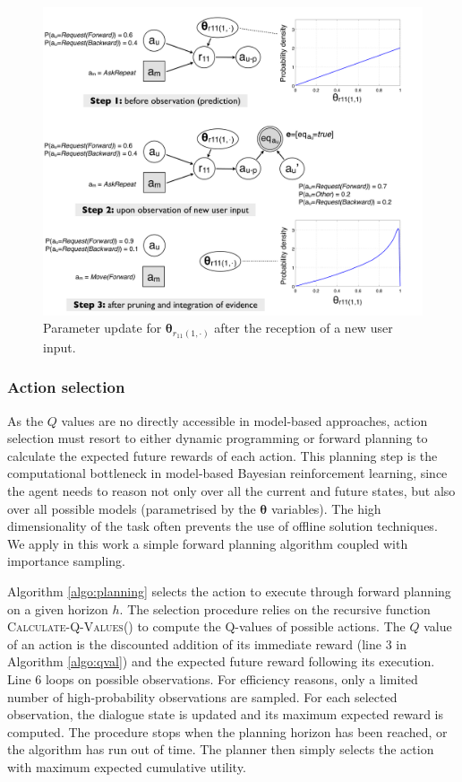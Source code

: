 \begin{figure}[h]
\centering
\includegraphics[scale=0.30]{imgs/learningexample.pdf}
\caption{Parameter update for $\boldsymbol\theta_{r_{11}(1,\cdot)}$ after the reception of a new user input. }
\label{fig:learningexample}
\end{figure}


\subsubsection*{Action selection}

 As the $Q$ values are no directly accessible in model-based approaches, action selection must resort to either dynamic programming or forward planning to calculate the expected future rewards of each action.  This planning step is the computational bottleneck in model-based Bayesian reinforcement learning, since the agent needs to reason not only over all the current and future states, but also over all possible models (parametrised by the $\boldsymbol\theta$ variables).  The high dimensionality of the task often prevents the use of offline solution techniques. We apply in this work a simple forward planning algorithm coupled with importance sampling. 

Algorithm \ref{algo:planning} selects the action to execute through forward planning on a given horizon $h$.  The selection procedure relies on the recursive function \textsc{Calculate-Q-Values}() to compute the Q-values of possible actions. The $Q$ value of an action is the discounted addition of its immediate reward (line 3 in Algorithm \ref{algo:qval}) and the expected future reward following its execution.  Line 6 loops on possible observations.  For efficiency reasons, only a limited number of high-probability observations are sampled. For each selected observation, the dialogue state is updated and its maximum expected reward is computed.  The procedure stops when the planning horizon has been reached, or the algorithm has run out of time. The planner then simply selects the action with maximum expected cumulative utility. 

